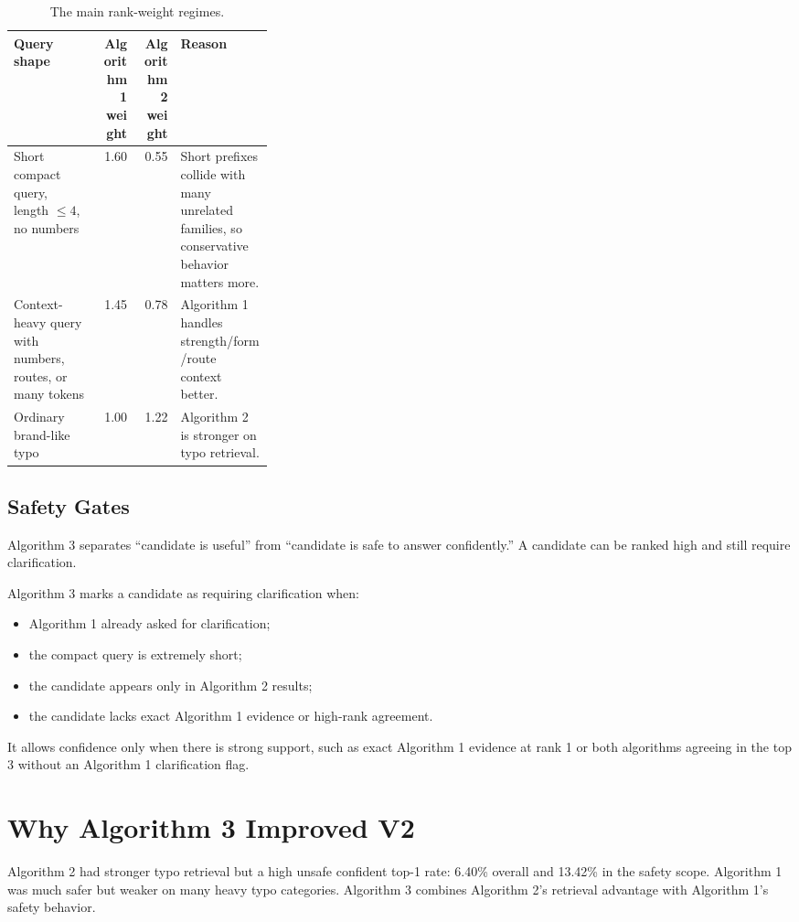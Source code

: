 \documentclass[11pt]{article}
\begin{document}
\begin{table}[H]
\centering
\small
\begin{tabularx}{\linewidth}{L{0.33\linewidth}rrY}
\toprule
\textbf{Query shape} & \textbf{Algorithm 1 weight} & \textbf{Algorithm 2 weight} & \textbf{Reason} \\
\midrule
Short compact query, length \(\leq 4\), no numbers & 1.60 & 0.55 &
Short prefixes collide with many unrelated families, so conservative behavior matters more. \\
Context-heavy query with numbers, routes, or many tokens & 1.45 & 0.78 &
Algorithm 1 handles strength/form/route context better. \\
Ordinary brand-like typo & 1.00 & 1.22 &
Algorithm 2 is stronger on typo retrieval. \\
\bottomrule
\end{tabularx}
\caption{The main rank-weight regimes.}
\end{table}

\subsection*{Safety Gates}

Algorithm 3 separates ``candidate is useful'' from ``candidate is safe to answer
confidently.'' A candidate can be ranked high and still require clarification.

Algorithm 3 marks a candidate as requiring clarification when:

\begin{itemize}
  \item Algorithm 1 already asked for clarification;
  \item the compact query is extremely short;
  \item the candidate appears only in Algorithm 2 results;
  \item the candidate lacks exact Algorithm 1 evidence or high-rank agreement.
\end{itemize}

It allows confidence only when there is strong support, such as exact Algorithm 1
evidence at rank 1 or both algorithms agreeing in the top 3 without an Algorithm 1
clarification flag.

\section{Why Algorithm 3 Improved V2}

Algorithm 2 had stronger typo retrieval but a high unsafe confident top-1 rate:
6.40\% overall and 13.42\% in the safety scope. Algorithm 1 was much safer but
weaker on many heavy typo categories. Algorithm 3 combines Algorithm 2's
retrieval advantage with Algorithm 1's safety behavior.
\end{document}
